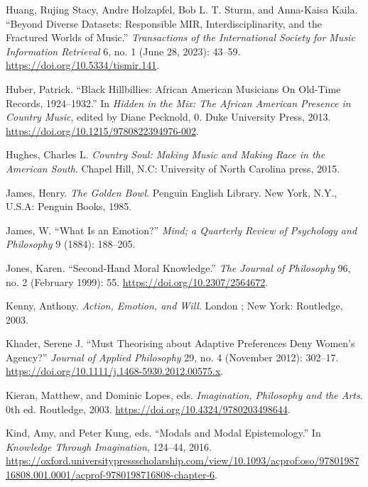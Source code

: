 \documentclass[phdthesis,12pt,final]{wuthesis}
\newlength{\cslhangindent}
\newenvironment{CSLReferences}[2] %
{\begin{list}{}{%
	\setlength{\itemindent}{0pt}
	\setlength{\leftmargin}{0pt}
	\setlength{\parsep}{0pt}
	\ifodd #1
	\setlength{\leftmargin}{\cslhangindent}
	\setlength{\itemindent}{-1\cslhangindent}
	\fi
	\setlength{\itemsep}{#2\baselineskip}}}
{\end{list}}
\theoremstyle{definition}
\theoremstyle{definition}
\theoremstyle{definition}
\theoremstyle{definition}
\theoremstyle{remark}
\begin{document}
\begin{CSLReferences}{1}{0}
Huang, Rujing Stacy, Andre Holzapfel, Bob L. T. Sturm, and Anna-Kaisa Kaila. {``Beyond {Diverse Datasets}: {Responsible MIR}, {Interdisciplinarity}, and the {Fractured Worlds} of {Music}.''} \emph{Transactions of the International Society for Music Information Retrieval} 6, no. 1 (June 28, 2023): 43--59. \url{https://doi.org/10.5334/tismir.141}.

Huber, Patrick. {``Black {Hillbillies}: {African American Musicians On Old-Time Records}, 1924--1932.''} In \emph{Hidden in the {Mix}: {The African American Presence} in {Country Music}}, edited by Diane Pecknold, 0. Duke University Press, 2013. \url{https://doi.org/10.1215/9780822394976-002}.

Hughes, Charles L. \emph{Country Soul: Making Music and Making Race in the {American South}}. Chapel Hill, N.C: University of North Carolina press, 2015.

James, Henry. \emph{The Golden Bowl}. Penguin {English} Library. New York, N.Y., U.S.A: Penguin Books, 1985.

James, W. {``What Is an Emotion?''} \emph{Mind; a Quarterly Review of Psychology and Philosophy} 9 (1884): 188--205.

Jones, Karen. {``Second-{Hand Moral Knowledge}.''} \emph{The Journal of Philosophy} 96, no. 2 (February 1999): 55. \url{https://doi.org/10.2307/2564672}.

Kenny, Anthony. \emph{Action, Emotion, and Will}. London ; New York: Routledge, 2003.

Khader, Serene J. {``Must {Theorising} about {Adaptive Preferences Deny Women}'s {Agency}?''} \emph{Journal of Applied Philosophy} 29, no. 4 (November 2012): 302--17. \url{https://doi.org/10.1111/j.1468-5930.2012.00575.x}.

Kieran, Matthew, and Dominic Lopes, eds. \emph{Imagination, {Philosophy} and the {Arts}}. 0th ed. Routledge, 2003. \url{https://doi.org/10.4324/9780203498644}.

Kind, Amy, and Peter Kung, eds. {``Modals and {Modal Epistemology}.''} In \emph{Knowledge {Through Imagination}}, 124--44, 2016. \url{https://oxford.universitypressscholarship.com/view/10.1093/acprof:oso/9780198716808.001.0001/acprof-9780198716808-chapter-6}.


\end{CSLReferences}
\end{document}

